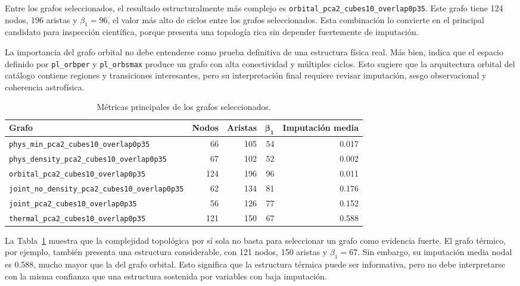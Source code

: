 Entre los grafos seleccionados, el resultado estructuralmente más complejo es \texttt{orbital\_pca2\_cubes10\_overlap0p35}. Este grafo tiene 124 nodos, 196 aristas y $\beta_1=96$, el valor más alto de ciclos entre los grafos seleccionados. Esta combinación lo convierte en el principal candidato para inspección científica, porque presenta una topología rica sin depender fuertemente de imputación.

La importancia del grafo orbital no debe entenderse como prueba definitiva de una estructura física real. Más bien, indica que el espacio definido por \texttt{pl\_orbper} y \texttt{pl\_orbsmax} produce un grafo con alta conectividad y múltiples ciclos. Esto sugiere que la arquitectura orbital del catálogo contiene regiones y transiciones interesantes, pero su interpretación final requiere revisar imputación, sesgo observacional y coherencia astrofísica.

\begin{table}[H]
\centering
\small
\begin{tabular}{p{}rrrr}
\toprule
\textbf{Grafo} & \textbf{Nodos} & \textbf{Aristas} & $\boldsymbol{\beta_1}$ & \textbf{Imputación media} \\
\midrule
\texttt{phys\_min\_pca2\_cubes10\_overlap0p35} & 66 & 105 & 54 & 0.017 \\
\texttt{phys\_density\_pca2\_cubes10\_overlap0p35} & 67 & 102 & 52 & 0.002 \\
\texttt{orbital\_pca2\_cubes10\_overlap0p35} & 124 & 196 & 96 & 0.011 \\
\texttt{joint\_no\_density\_pca2\_cubes10\_overlap0p35} & 62 & 134 & 81 & 0.176 \\
\texttt{joint\_pca2\_cubes10\_overlap0p35} & 56 & 126 & 77 & 0.152 \\
\texttt{thermal\_pca2\_cubes10\_overlap0p35} & 121 & 150 & 67 & 0.588 \\
\bottomrule
\end{tabular}
\caption{Métricas principales de los grafos seleccionados.}
\label{tab:selected_graph_metrics}
\end{table}

La Tabla~\ref{tab:selected_graph_metrics} muestra que la complejidad topológica por sí sola no basta para seleccionar un grafo como evidencia fuerte. El grafo térmico, por ejemplo, también presenta una estructura considerable, con 121 nodos, 150 aristas y $\beta_1=67$. Sin embargo, su imputación media nodal es 0.588, mucho mayor que la del grafo orbital. Esto significa que la estructura térmica puede ser informativa, pero no debe interpretarse con la misma confianza que una estructura sostenida por variables con baja imputación.

